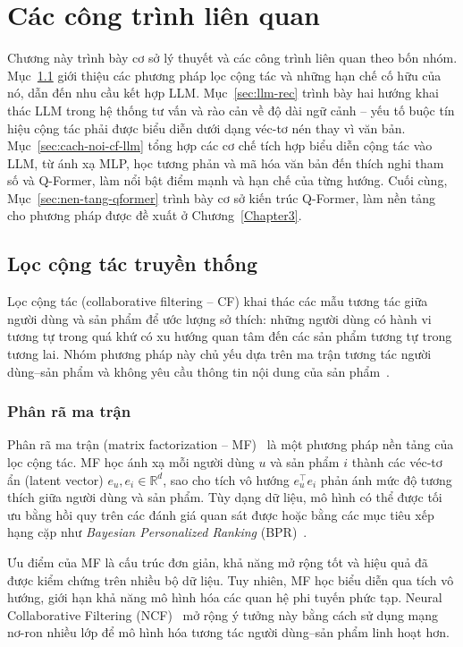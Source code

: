 \chapter{Các công trình liên quan}
\label{Chapter2}

Chương này trình bày cơ sở lý thuyết và các công trình liên quan theo bốn nhóm.
Mục~\ref{sec:cf-truyen-thong} giới thiệu các phương pháp lọc cộng tác và những hạn chế
cố hữu của nó, dẫn đến nhu cầu kết hợp LLM. Mục~\ref{sec:llm-rec} trình bày hai hướng khai thác LLM trong hệ thống
tư vấn và rào cản về độ dài ngữ cảnh -- yếu tố buộc tín hiệu cộng tác phải được biểu diễn
dưới dạng véc-tơ nén thay vì văn bản. Mục~\ref{sec:cach-noi-cf-llm} tổng hợp các cơ chế tích
hợp biểu diễn cộng tác vào LLM, từ ánh xạ MLP, học tương phản và mã hóa văn bản đến thích
nghi tham số và Q-Former, làm nổi bật điểm mạnh và hạn chế của từng hướng. Cuối cùng, 
Mục~\ref{sec:nen-tang-qformer} trình bày cơ sở kiến trúc Q-Former, làm nền tảng cho phương pháp
được đề xuất ở Chương~\ref{Chapter3}.

\section{Lọc cộng tác truyền thống}
\label{sec:cf-truyen-thong}

Lọc cộng tác (collaborative filtering -- CF) khai thác các mẫu tương tác giữa người dùng và
sản phẩm để ước lượng sở thích: những người dùng có hành vi tương tự
trong quá khứ có xu hướng quan tâm đến các sản phẩm tương tự trong tương lai. Nhóm phương
pháp này chủ yếu dựa trên ma trận tương tác người dùng--sản phẩm và không yêu cầu thông
tin nội dung của sản phẩm~\cite{zhang2019deep}.

\subsection{Phân rã ma trận}
\label{ssec:mf}

Phân rã ma trận (matrix factorization -- MF)~\cite{mf2009} là một phương pháp nền tảng của
lọc cộng tác. MF học ánh xạ mỗi người dùng $u$ và sản phẩm $i$ thành các véc-tơ ẩn (latent vector) $e_u, e_i \in
\mathbb{R}^d$, sao cho tích vô hướng $e_u^\top e_i$ phản ánh mức độ tương thích giữa người
dùng và sản phẩm. Tùy dạng dữ liệu, mô hình có thể được tối ưu bằng hồi quy trên các đánh
giá quan sát được hoặc bằng các mục tiêu xếp hạng cặp như \textit{Bayesian Personalized
Ranking} (BPR)~\cite{bpr2009}.

Ưu điểm của MF là cấu trúc đơn giản, khả năng mở rộng tốt và hiệu quả đã được kiểm chứng
trên nhiều bộ dữ liệu. Tuy nhiên, MF học biểu diễn qua tích vô hướng, giới hạn khả năng mô
hình hóa các quan hệ phi tuyến phức tạp. Neural Collaborative Filtering (NCF)~\cite{ncf2017}
mở rộng ý tưởng này bằng cách sử dụng mạng nơ-ron nhiều lớp để mô hình hóa tương tác
người dùng--sản phẩm linh hoạt hơn.

